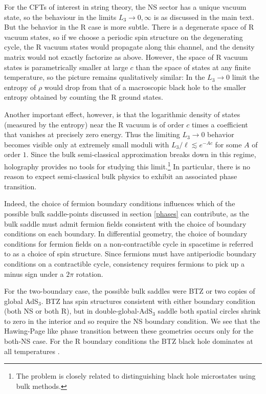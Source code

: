 \documentclass[12pt]{article}
\numberwithin{equation}{section}
\begin{document}
For the CFTs of interest in string theory, the NS sector has a unique vacuum state, so the behaviour in the limits $L_3 \to 0, \infty$ is as discussed in the main text. But the behavior in the R case is more subtle.  There is a degenerate space of R vacuum states, so if we choose a periodic spin structure on the degenerating cycle, the R vacuum states would propagate along this channel, and the density matrix would not exactly factorize as above. However, the space of R vacuum states is parametrically smaller at large $c$ than the space of states at any finite temperature, so the picture remains qualitatively similar: In the $L_3 \to 0$ limit the entropy of $\rho$ would drop from that of a macroscopic black hole to the smaller entropy obtained by counting the R ground states.

Another important effect, however, is that the logarithmic density of states (measured by the entropy) near the R vacuum is of order $c$ times a coefficient that vanishes at precisely zero energy.  Thus the limiting $L_3 \rightarrow 0$ behavior becomes visible only at extremely small moduli with $L_3/\ell \lesssim e^{-A c}$ for some $A$ of order $1$. Since the bulk semi-classical approximation breaks down in this regime, holography provides no tools for studying this limit.\footnote{The problem is closely related to distinguishing black hole microstates using bulk methods.} In particular, there is no reason to expect semi-classical bulk physics to exhibit an associated phase transition.

Indeed, the choice of fermion boundary conditions influences which of the possible bulk saddle-points discussed in section \ref{phases} can contribute, as the bulk saddle must admit fermion fields consistent with the choice of boundary conditions on each boundary. In differential geometry, the choice of boundary conditions for fermion fields on a non-contractible cycle in spacetime is referred to as a choice of spin structure.  Since fermions must have antiperiodic boundary conditions on a contractible cycle, consistency requires fermions to pick up a minus sign under a $2\pi$ rotation.

For the two-boundary case, the possible bulk saddles were BTZ or two copies of global AdS$_3$.  BTZ has spin structures consistent with either boundary condition (both NS or both R), but in double-global-AdS$_3$ saddle both spatial circles shrink to zero in the interior and so require the NS boundary condition.  We see that the Hawing-Page like phase transition between these geometries occurs only for the both-NS case. For the R boundary conditions the BTZ black hole dominates at all temperatures \cite{Maldacena:1998bw}.
\end{document}
